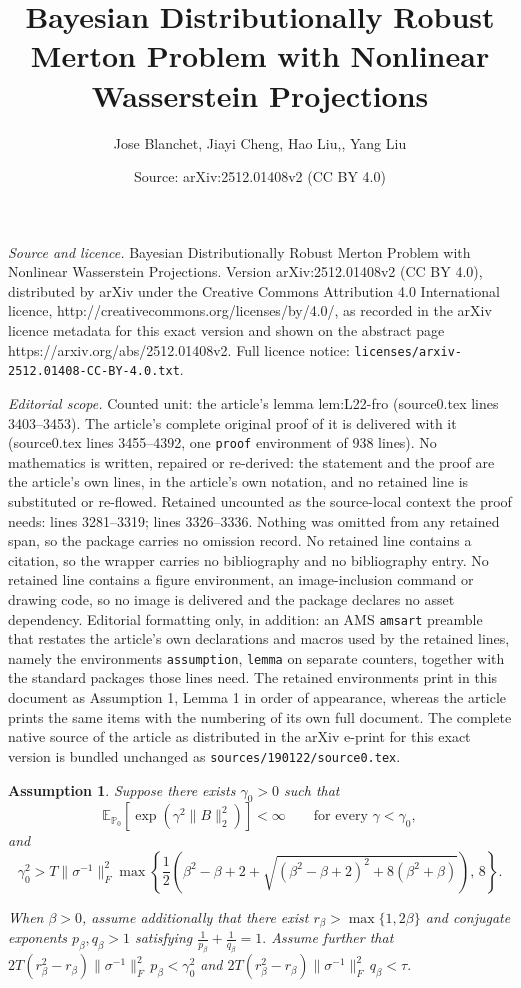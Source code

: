 \documentclass[10pt,a4paper]{amsart}
\title{Bayesian Distributionally Robust Merton Problem with Nonlinear Wasserstein Projections}
\author{Jose Blanchet, Jiayi Cheng, Hao Liu,, Yang Liu}
\date{Source: arXiv:2512.01408v2 (CC BY 4.0)}
\newtheorem{assumption}{Assumption}
\newcommand{\E}{\mathbb{E}}
\begin{document}
\maketitle

\noindent\emph{Source and licence.} Bayesian Distributionally Robust Merton Problem with Nonlinear Wasserstein Projections. Version arXiv:2512.01408v2 (CC BY 4.0), distributed by arXiv under the Creative Commons Attribution 4.0 International licence, http://creativecommons.org/licenses/by/4.0/, as recorded in the arXiv licence metadata for this exact version and shown on the abstract page https://arxiv.org/abs/2512.01408v2. Full licence notice: \texttt{licenses/arxiv-2512.01408-CC-BY-4.0.txt}.\par\smallskip

\noindent\textit{Editorial scope.} Counted unit: the article's lemma lem:L22-fro (source0.tex lines 3403--3453). The article's complete original proof of it is delivered with it (source0.tex lines 3455--4392, one \texttt{proof} environment of 938 lines). No mathematics is written, repaired or re-derived: the statement and the proof are the article's own lines, in the article's own notation, and no retained line is substituted or re-flowed.  Retained uncounted as the source-local context the proof needs: lines 3281--3319; lines 3326--3336.  Nothing was omitted from any retained span, so the package carries no omission record.  No retained line contains a citation, so the wrapper carries no bibliography and no bibliography entry.  No retained line contains a figure environment, an image-inclusion command or drawing code, so no image is delivered and the package declares no asset dependency.  Editorial formatting only, in addition: an AMS \texttt{amsart} preamble that restates the article's own declarations and macros used by the retained lines, namely the environments \texttt{assumption}, \texttt{lemma} on separate counters, together with the standard packages those lines need.  The retained environments print in this document as Assumption 1, Lemma 1 in order of appearance, whereas the article prints the same items with the numbering of its own full document.  The complete native source of the article as distributed in the arXiv e-print for this exact version is bundled unchanged as \texttt{sources/190122/source0.tex}.
\begin{assumption}\label{subGaussianFinal}
Suppose there exists $\gamma_0>0$ such that
\[
\E_{\mathbb P_0}
\left[
\exp\!\left(\gamma^2\|B\|_2^2\right)
\right]
<\infty
\qquad
\text{for every }\gamma<\gamma_0,
\]
and
\[
\gamma_0^2
>
T\|\sigma^{-1}\|_F^2
\max\left\{
\frac12
\left(
\beta^2-\beta+2
+
\sqrt{
(\beta^2-\beta+2)^2+8(\beta^2+\beta)
}
\right),
\,8
\right\}.
\]

When $\beta>0$, assume additionally that there exist $r_\beta>\max\{1,2\beta\}$
and conjugate exponents $p_\beta,q_\beta>1$ satisfying $\frac1{p_\beta}+\frac1{q_\beta}=1.$
Assume further that $2T(r_\beta^2-r_\beta)
\|\sigma^{-1}\|_F^2\,p_\beta
<
\gamma_0^2$ and $2T(r_\beta^2-r_\beta)
\|\sigma^{-1}\|_F^2\,q_\beta
<
\tau.$
\end{assumption}
\end{document}
